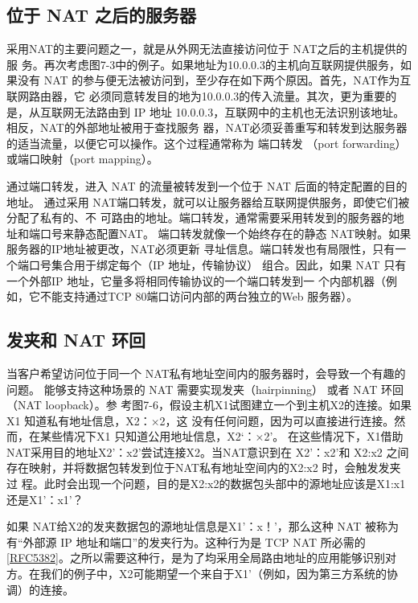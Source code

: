 \subsection{位于 NAT 之后的服务器}

采用NAT的主要问题之一，就是从外网无法直接访问位于 NAT之后的主机提供的服
务。再次考虑图7-3中的例子。如果地址为10.0.0.3的主机向互联网提供服务，如果没有
NAT 的参与便无法被访问到，至少存在如下两个原因。首先，NAT作为互联网路由器，它
必须同意转发目的地为10.0.0.3的传入流量。其次，更为重要的是，从互联网无法路由到 IP
地址 10.0.0.3，互联网中的主机也无法识别该地址。相反，NAT的外部地址被用于查找服务
器，NAT必须妥善重写和转发到达服务器的适当流量，以便它可以操作。这个过程通常称为
端口转发 （port forwarding） 或端口映射（port mapping）。

通过端口转发，进入 NAT 的流量被转发到一个位于 NAT 后面的特定配置的目的地址。
通过采用 NAT端口转发，就可以让服务器给互联网提供服务，即使它们被分配了私有的、不
可路由的地址。端口转发，通常需要采用转发到的服务器的地址和端口号来静态配置NAT。
端口转发就像一个始终存在的静态 NAT映射。如果服务器的IP地址被更改，NAT必须更新
寻址信息。端口转发也有局限性，只有一个端口号集合用于绑定每个（IP 地址，传输协议）
组合。因此，如果 NAT 只有一个外部IP 地址，它量多将相同传输协议的一个端口转发到一
个内部机器（例如，它不能支持通过TCP 80端口访问内部的两台独立的Web 服务器）。

\subsection{发夹和 NAT 环回}

当客户希望访问位于同一个 NAT私有地址空间内的服务器时，会导致一个有趣的问题。
能够支持这种场景的 NAT 需要实现发夹（hairpinning） 或者 NAT 环回（NAT loopback）。参
考图7-6，假设主机X1试图建立一个到主机X2的连接。如果X1 知道私有地址信息，X2：×2，这
没有任何问题，因为可以直接进行连接。然而，在某些情况下X1 只知道公用地址信息，X2‘：×2’。
在这些情况下，X1借助NAT采用目的地址X2'：x2'尝试连接X2。当NAT意识到在 X2'：x2'和
X2:x2 之间存在映射，并将数据包转发到位于NAT私有地址空间内的X2:x2 时，会触发发夹过
程。此时会出现一个问题，目的是X2:x2的数据包头部中的源地址应该是X1:x1 还是X1'：x1'？

如果 NAT给X2的发夹数据包的源地址信息是X1'：x！'，那么这种 NAT 被称为有“外部源 IP
地址和端口”的发夹行为。这种行为是 TCP NAT
所必需的\href{https://www.rfc-editor.org/rfc/rfc5382}{[RFC5382]}。之所以需要这种行，是为了均采用全局路由地址的应用能够识别对
方。在我们的例子中，X2可能期望一个来自于X1'（例如，因为第三方系统的协调）的连接。

